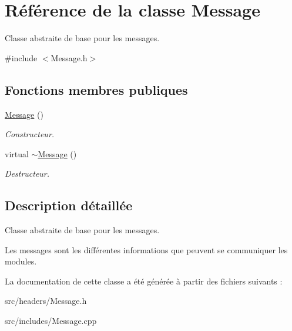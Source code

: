 \hypertarget{classMessage}{\section{Référence de la classe Message}
\label{classMessage}
}


Classe abstraite de base pour les messages.  




{\ttfamily \#include $<$Message.\-h$>$}

\subsection*{Fonctions membres publiques}
\begin{DoxyCompactItemize}
\item 
\hypertarget{classMessage_a4fc4f717b634e66070366cb7722d7761}{\hyperlink{classMessage_a4fc4f717b634e66070366cb7722d7761}{Message} ()}\label{classMessage_a4fc4f717b634e66070366cb7722d7761}

\begin{DoxyCompactList}\small\item\em Constructeur. \end{DoxyCompactList}\item 
\hypertarget{classMessage_a3f7275462831f787a861271687bcad67}{virtual \hyperlink{classMessage_a3f7275462831f787a861271687bcad67}{$\sim$\-Message} ()}\label{classMessage_a3f7275462831f787a861271687bcad67}

\begin{DoxyCompactList}\small\item\em Destructeur. \end{DoxyCompactList}\end{DoxyCompactItemize}


\subsection{Description détaillée}
Classe abstraite de base pour les messages. 

Les messages sont les différentes informations que peuvent se communiquer les modules. 

La documentation de cette classe a été générée à partir des fichiers suivants \-:\begin{DoxyCompactItemize}
\item 
src/headers/Message.\-h\item 
src/includes/Message.\-cpp\end{DoxyCompactItemize}
